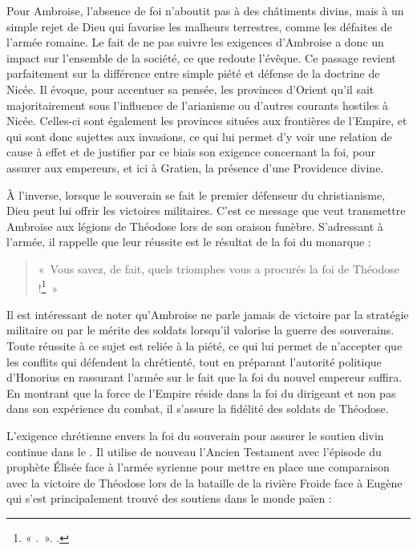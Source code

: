 Pour Ambroise, l’absence de foi n’aboutit pas à des châtiments divins, mais à un simple rejet de Dieu qui favorise les malheurs terrestres, comme les défaites de l’armée romaine. Le fait de ne pas suivre les exigences d’Ambroise a donc un impact sur l’ensemble de la société, ce que redoute l’évêque. Ce passage revient parfaitement sur la différence entre simple piété et défense de la doctrine de Nicée. Il évoque, pour accentuer sa pensée, les provinces d'Orient qu'il sait majoritairement sous l'influence de l'arianisme ou d'autres courants hostiles à Nicée. Celles-ci sont également les provinces situées aux frontières de l'Empire, et qui sont donc sujettes aux invasions, ce qui lui permet d'y voir une relation de cause à effet et de justifier par ce biais son exigence concernant la foi, pour assurer aux empereurs, et ici à Gratien, la présence d'une Providence divine.

\bigskip

À l'inverse, lorsque le souverain se fait le premier défenseur du christianisme, Dieu peut lui offrir les victoires militaires. C'est ce message que veut transmettre Ambroise aux légions de Théodose lors de son oraison funèbre. S'adressant à l'armée, il rappelle que leur réussite est le résultat de la foi du monarque :

\bigskip

\begin{quote}
«~Vous savez, de fait, quels triomphes vous a procurés la foi de Théodose !\footnote{« .~». \cite[]{ambroise_mort_theodose}.}~»
\end{quote}

\bigskip

Il est intéressant de noter qu'Ambroise ne parle jamais de victoire par la stratégie militaire ou par le mérite des soldats lorsqu'il valorise la guerre des souverains. Toute réussite à ce sujet est reliée à la piété, ce qui lui permet de n'accepter que les conflits qui défendent la chrétienté, tout en préparant l'autorité politique d'Honorius en rassurant l'armée sur le fait que la foi du nouvel empereur suffira. En montrant que la force de l'Empire réside dans la foi du dirigeant et non pas dans son expérience du combat, il s'assure la fidélité des soldats de Théodose.

\bigskip

L'exigence chrétienne envers la foi du souverain pour assurer le soutien divin continue dans le . Il utilise de nouveau l'Ancien Testament avec l'épisode du prophète Élisée face à l'armée syrienne pour mettre en place une comparaison avec la victoire de Théodose lors de la bataille de la rivière Froide face à Eugène qui s'est principalement trouvé des soutiens dans le monde païen :

